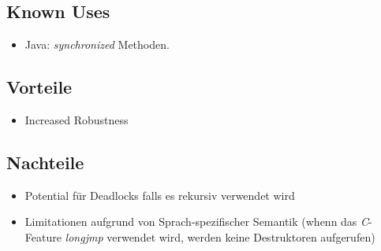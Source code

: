 \subsection*{Known Uses}

\begin{itemize}
	\item Java: \emph{synchronized} Methoden.
\end{itemize}

\subsection*{Vorteile}

\begin{itemize}
	\item Increased Robustness
\end{itemize}

\subsection*{Nachteile}

\begin{itemize}
	\item Potential für Deadlocks falls es rekursiv verwendet wird
	\item Limitationen aufgrund von Sprach-spezifischer Semantik (whenn das \emph{C}-Feature \emph{longjmp} verwendet wird, werden keine Destruktoren aufgerufen)
\end{itemize}

